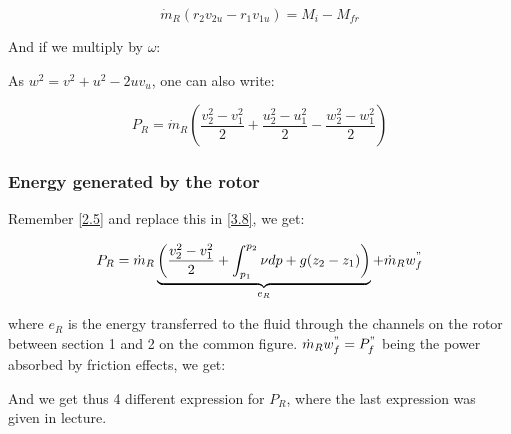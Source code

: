 \begin{equation}
\dot{m}_R (r_2 v_{2u} - r_1 v_{1u}) = M_i - M_{fr}
\end{equation}

And if we multiply by $\omega$: 

\begin{center}
\end{center}

As $w^2 = v^2 + u^2 - 2 u v_u$, one can also write: 

\begin{equation}
P_R = \dot{m}_R \left( \frac{v_2 ^2 - v_1^2}{2} + \frac{u_2 ^2 - u_1^2}{2} - \frac{w_2 ^2 - w_1^2}{2} \right)
\label{3.8}
\end{equation}

\subsubsection{Energy generated by the rotor}
Remember \eqref{2.5} and replace this in \eqref{3.8}, we get: 

\begin{equation}
P_R = \dot{m}_R \underbrace{\left( \frac{v_2 ^2 - v_1^2}{2}  + \int _{p_1}^{p_2} \nu dp + g(z_2 - z_1) \right)}_{e_R} + \dot{m} _R w^"_f
\end{equation}

where $e_R$ is the energy transferred to the fluid through the channels on the rotor between section 1 and 2 on the common figure. $\dot{m}_R w^"_f = P^"_f$ being the power absorbed by friction effects, we get: 

\begin{center}
\end{center}

And we get thus 4 different expression for $P_R$, where the last expression was given in lecture. 

